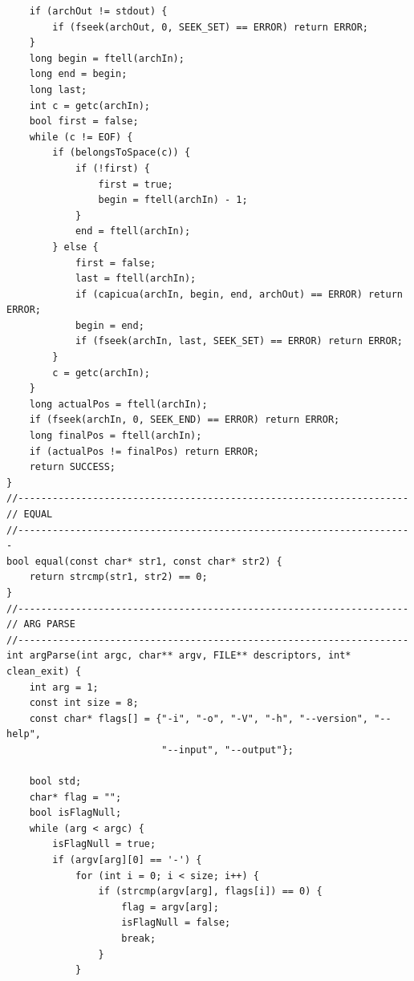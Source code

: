 \documentclass[a4paper,10pt]{article}
\begin{document}
\begin{lstlisting}
    if (archOut != stdout) {
        if (fseek(archOut, 0, SEEK_SET) == ERROR) return ERROR;
    }
    long begin = ftell(archIn);
    long end = begin;
    long last;
    int c = getc(archIn);
    bool first = false;
    while (c != EOF) {
        if (belongsToSpace(c)) {
            if (!first) {
                first = true;
                begin = ftell(archIn) - 1;
            }
            end = ftell(archIn);
        } else {
            first = false;
            last = ftell(archIn);
            if (capicua(archIn, begin, end, archOut) == ERROR) return ERROR;
            begin = end;
            if (fseek(archIn, last, SEEK_SET) == ERROR) return ERROR;
        }
        c = getc(archIn);
    }
    long actualPos = ftell(archIn);
    if (fseek(archIn, 0, SEEK_END) == ERROR) return ERROR;
    long finalPos = ftell(archIn);
    if (actualPos != finalPos) return ERROR;
    return SUCCESS;
}
//--------------------------------------------------------------------
// EQUAL
//---------------------------------------------------------------------
bool equal(const char* str1, const char* str2) {
    return strcmp(str1, str2) == 0;
}
//--------------------------------------------------------------------
// ARG PARSE
//--------------------------------------------------------------------
int argParse(int argc, char** argv, FILE** descriptors, int* clean_exit) {
    int arg = 1;
    const int size = 8;
    const char* flags[] = {"-i", "-o", "-V", "-h", "--version", "--help",
                           "--input", "--output"};

    bool std;
    char* flag = "";
    bool isFlagNull;
    while (arg < argc) {
        isFlagNull = true;
        if (argv[arg][0] == '-') {
            for (int i = 0; i < size; i++) {
                if (strcmp(argv[arg], flags[i]) == 0) {
                    flag = argv[arg];
                    isFlagNull = false;
                    break;
                }
            }


\end{lstlisting}
\end{document}

